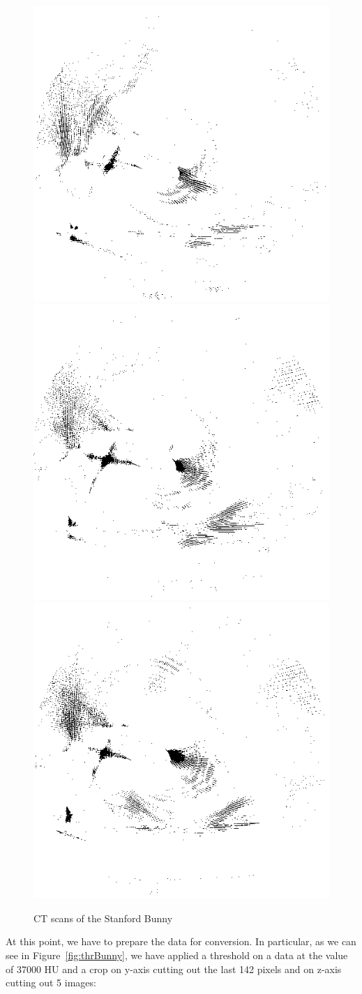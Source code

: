 \begin{figure}[htb] %
   \centering
   \includegraphics[width=0.30\linewidth]{images/CTBunny0.png}\hfill
   \includegraphics[width=0.30\linewidth]{images/CTBunny1.png}\hfill
   \includegraphics[width=0.30\linewidth]{images/CTBunny2.png}
   \caption[CT scans of the Stanford Bunny]{CT scans of the Stanford Bunny}
   \label{fig:CTBunny}
\end{figure}

At this point, we have to prepare the data for conversion. In particular, as we can see in Figure~\ref{fig:thrBunny}, we have applied a threshold on a data at the value of 37000 HU and a crop on y-axis cutting out the last 142 pixels and on z-axis cutting out 5 images:

